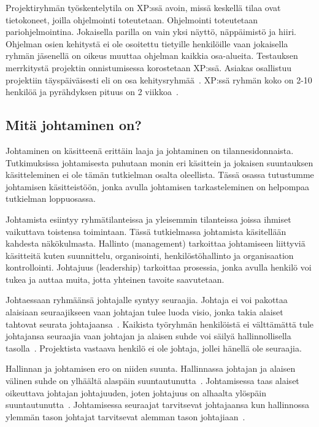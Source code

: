 \documentclass[finnish]{tktltiki2}
\theoremstyle{definition}
\theoremstyle{remark}
\begin{document}
Projektiryhmän työskentelytila on XP:ssä avoin, missä keskellä tilaa ovat tietokoneet, joilla ohjelmointi toteutetaan. Ohjelmointi toteutetaan pariohjelmointina. Jokaisella parilla on vain yksi näyttö, näppäimistö ja hiiri. Ohjelman osien kehitystä ei ole osoitettu tietyille henkilöille vaan jokaisella ryhmän jäsenellä on oikeus muuttaa ohjelman kaikkia osa-alueita. Testauksen merrkitystä projektin onnistumisessa korostetaan XP:ssä. Asiakas osallistuu projektiin täyspäiväisesti eli on osa kehitysryhmää~\cite{796139}. XP:ssä ryhmän koko on 2-10 henkilöä ja pyrähdyksen pituus on 2 viikkoa~\cite{cohen2004introduction}. 


\subsection{Mitä johtaminen on?}

Johtaminen on käsitteenä erittäin laaja ja johtaminen on tilannesidonnaista. Tutkimuksissa johtamisesta puhutaan monin eri käsittein ja jokaisen suuntauksen käsitteleminen ei ole tämän tutkielman osalta oleellista. Tässä osassa tutustumme johtamisen käsitteistöön, jonka avulla johtamisen tarkasteleminen on helpompaa tutkielman loppuosassa.

Johtamista esiintyy ryhmätilanteissa ja yleisemmin tilanteissa joissa ihmiset vaikuttava toistensa toimintaan. Tässä tutkielmassa johtamista käsitellään kahdesta näkökulmasta. Hallinto (management) tarkoittaa johtamiseen liittyviä käsitteitä kuten suunnittelu, organisointi, henkilöstöhallinto ja organisaation kontrollointi. Johtajuus (leadership) tarkoittaa prosessia, jonka avulla henkilö voi tukea ja auttaa muita, jotta yhteinen tavoite saavutetaan.

Johtaessaan ryhmäänsä johtajalle syntyy seuraajia. Johtaja ei voi pakottaa alaisiaan seuraajikseen vaan johtajan tulee luoda visio, jonka takia alaiset tahtovat seurata johtajaansa~\cite{raccoon2006leadership}. Kaikista työryhmän henkilöistä ei välttämättä tule johtajansa seuraajia vaan johtajan ja alaisen suhde voi säilyä hallinnollisella tasolla~\cite{raccoon2006leadership}. Projektista vastaava henkilö ei ole johtaja, jollei hänellä ole seuraajia.

Hallinnan ja johtamisen ero on niiden suunta. Hallinnassa johtajan ja alaisen välinen suhde on ylhäältä alaspäin suuntautunutta~\cite{raccoon2006leadership}. Johtamisessa taas alaiset oikeuttava johtajan johtajuuden, joten johtajuus on alhaalta ylöspäin suuntautunutta~\cite{raccoon2006leadership}. Johtamisessa seuraajat tarvitsevat johtajaansa kun hallinnossa ylemmän tason johtajat tarvitsevat alemman tason johtajiaan~\cite{raccoon2006leadership}.
\end{document}
